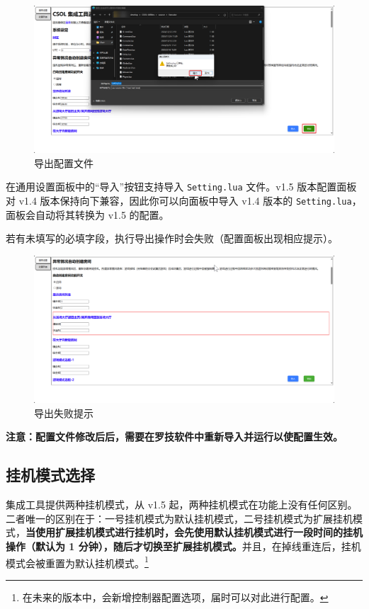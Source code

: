 \begin{figure}[H]
    \Centering
    \includegraphics[width=\textwidth]{assets/export_setting}
    \caption{导出配置文件}
    \label{ch2fig-export-setting}
\end{figure}

在通用设置面板中的“导入”按钮支持导入 \lstinline{Setting.lua} 文件。v1.5 版本配置面板对 v1.4 版本保持向下兼容，因此你可以向面板中导入 v1.4 版本的 \lstinline{Setting.lua}，面板会自动将其转换为 v1.5 的配置。

若有未填写的必填字段，执行导出操作时会失败（配置面板出现相应提示）。

\begin{figure}[H]
    \Centering
    \includegraphics[width=\textwidth]{assets/export_error}
    \caption{导出失败提示}
\end{figure}

\textbf{\color{red}注意：配置文件修改后后，需要在罗技软件中重新导入并运行以使配置生效。}

\subsection{挂机模式选择}

集成工具提供两种挂机模式，从 v1.5 起，两种挂机模式在功能上没有任何区别。二者唯一的区别在于：一号挂机模式为默认挂机模式，二号挂机模式为扩展挂机模式，\textbf{当使用扩展挂机模式进行挂机时，会先使用默认挂机模式进行一段时间的挂机操作（默认为 1 分钟），随后才切换至扩展挂机模式。}并且，在掉线重连后，挂机模式会被重置为默认挂机模式。\footnote{在未来的版本中，会新增控制器配置选项，届时可以对此进行配置。}

